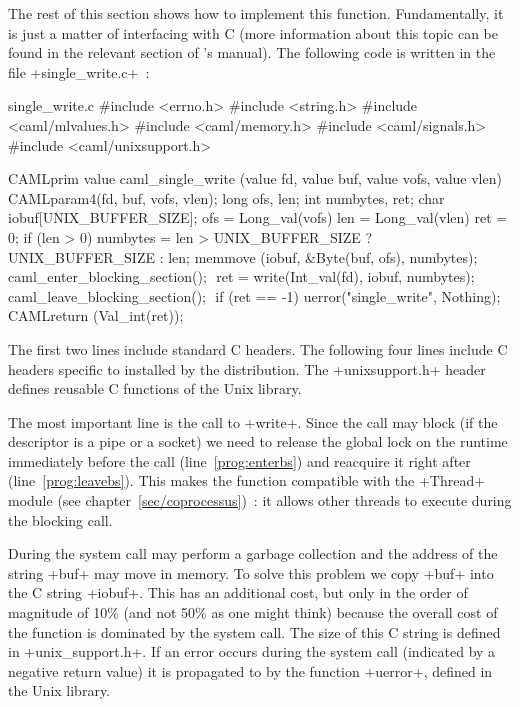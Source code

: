 The rest of this section shows how to implement this
function. Fundamentally, it is just a matter of interfacing {\ocaml} with
C (more information about this topic can be found in the relevant
section of {\ocaml}'s manual). The following code is written in the file
\ml+single_write.c+~:
%
\begin{listingcodefile}[style=numbers]{single_write.c}
#include <errno.h>
#include <string.h>
#include <caml/mlvalues.h>
#include <caml/memory.h>
#include <caml/signals.h>
#include <caml/unixsupport.h>

CAMLprim value caml_single_write
        (value fd, value buf, value vofs, value vlen) {
  CAMLparam4(fd, buf, vofs, vlen);
  long ofs, len;
  int numbytes, ret;
  char iobuf[UNIX_BUFFER_SIZE];
  ofs = Long_val(vofs)
  len = Long_val(vlen)
  ret = 0;
  if (len > 0) {
    numbytes = len > UNIX_BUFFER_SIZE ? UNIX_BUFFER_SIZE : len;
    memmove (iobuf, &Byte(buf, ofs), numbytes);
    caml_enter_blocking_section(); $\label{prog:enterbs}$
    ret = write(Int_val(fd), iobuf, numbytes);
    caml_leave_blocking_section(); $\label{prog:leavebs}$
    if (ret == -1) uerror("single_write", Nothing);
  }
  CAMLreturn (Val_int(ret));
}
\end{listingcodefile}
% 
The first two lines include standard C headers. The following four
lines include C headers specific to {\ocaml} installed by the
distribution. The \ml+unixsupport.h+ header defines reusable C
functions of the {\ocaml} Unix library.

The most important line is the call to \ml+write+. Since the call may
block (if the descriptor is a pipe or a socket) we need to release the
global lock on the {\ocaml} runtime immediately before the call
(line~\ref{prog:enterbs}) and reacquire it right after
(line~\ref{prog:leavebs}). This makes the function compatible with the
\ml+Thread+ module (see chapter~\ref{sec/coprocessus})~: it allows
other threads to execute during the blocking call. 

During the system call {\ocaml} may perform a garbage collection and
the address of the {\ocaml} string \ml+buf+ may move in memory. To
solve this problem we copy \ml+buf+ into the C string \ml+iobuf+.
This has an additional cost, but only in the order of magnitude of
10\% (and not 50\% as one might think) because the overall cost of the
function is dominated by the system call. The size of this C string is
defined in \ml+unix_support.h+. If an error occurs during the system
call (indicated by a negative return value) it is propagated to
{\ocaml} by the function \ml+uerror+, defined in the {\ocaml} Unix library.

